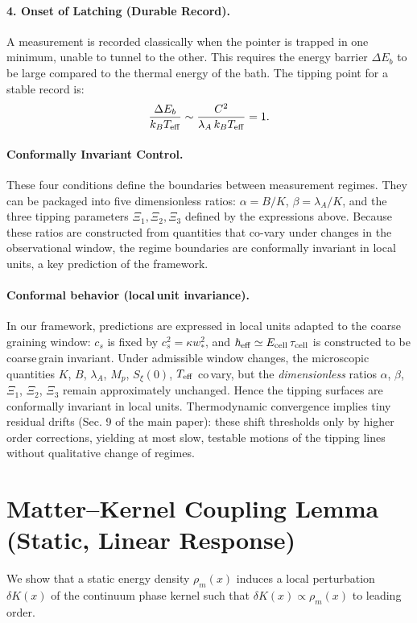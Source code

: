 \documentclass[11pt]{article}
\begin{document}
\paragraph{4. Onset of Latching (Durable Record).} A measurement is recorded classically when the pointer is trapped in one minimum, unable to tunnel to the other. This requires the energy barrier $\Delta E_b$ to be large compared to the thermal energy of the bath. The tipping point for a stable record is:
\begin{equation}
  \frac{\Delta E_b}{k_B T_{\rm eff}} \sim \frac{C^2}{\lambda_A \, k_B T_{\rm eff}} = 1.
\end{equation}

\paragraph{Conformally Invariant Control.} These four conditions define the boundaries between measurement regimes. They can be packaged into five dimensionless ratios: $\alpha = B/K$, $\beta = \lambda_A/K$, and the three tipping parameters $\Xi_1, \Xi_2, \Xi_3$ defined by the expressions above. Because these ratios are constructed from quantities that co-vary under changes in the observational window, the regime boundaries are conformally invariant in local units, a key prediction of the framework.

\paragraph{Conformal behavior (local\,unit invariance).} In our framework, predictions are expressed in local units adapted to the coarse\,graining window: $c_s$ is fixed by $c_s^2=\kappa w_*^2$, and $\hbar_{\rm eff}\simeq E_{\rm cell}\,\tau_{\rm cell}$ is constructed to be coarse\,grain invariant. Under admissible window changes, the microscopic quantities $K$, $B$, $\lambda_A$, $M_p$, $S_\xi(0)$, $T_{\rm eff}$ co\,vary, but the \emph{dimensionless} ratios $\alpha$, $\beta$, $\Xi_1$, $\Xi_2$, $\Xi_3$ remain approximately unchanged. Hence the tipping surfaces are conformally invariant in local units. Thermodynamic convergence implies tiny residual drifts (Sec. 9 of the main paper): these shift thresholds only by higher\,order corrections, yielding at most slow, testable motions of the tipping lines without qualitative change of regimes.

\section{Matter--Kernel Coupling Lemma (Static, Linear Response)}\label{si:matter-kernel}
We show that a static energy density $\rho_m(x)$ induces a local perturbation $\delta K(x)$ of the continuum phase kernel such that $\delta K(x) \propto \rho_m(x)$ to leading order.
\end{document}
